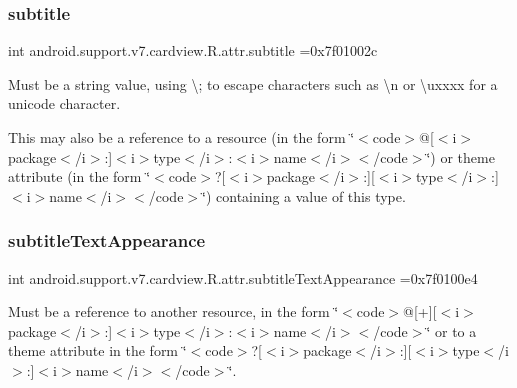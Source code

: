 \subsubsection{\texorpdfstring{subtitle}{subtitle}}
{\footnotesize\ttfamily int android.\+support.\+v7.\+cardview.\+R.\+attr.\+subtitle =0x7f01002c\hspace{0.3cm}{\ttfamily [static]}}

Must be a string value, using \textquotesingle{}\textbackslash{};\textquotesingle{} to escape characters such as \textquotesingle{}\textbackslash{}n\textquotesingle{} or \textquotesingle{}\textbackslash{}uxxxx\textquotesingle{} for a unicode character. 

This may also be a reference to a resource (in the form \char`\"{}$<$code$>$@\mbox{[}$<$i$>$package$<$/i$>$\+:\mbox{]}$<$i$>$type$<$/i$>$\+:$<$i$>$name$<$/i$>$$<$/code$>$\char`\"{}) or theme attribute (in the form \char`\"{}$<$code$>$?\mbox{[}$<$i$>$package$<$/i$>$\+:\mbox{]}\mbox{[}$<$i$>$type$<$/i$>$\+:\mbox{]}$<$i$>$name$<$/i$>$$<$/code$>$\char`\"{}) containing a value of this type. \mbox{\label{classandroid_1_1support_1_1v7_1_1cardview_1_1R_1_1attr_ac11cc67ed57bc796e7e120d6c5b5e347}} 
\subsubsection{\texorpdfstring{subtitle\+Text\+Appearance}{subtitleTextAppearance}}
{\footnotesize\ttfamily int android.\+support.\+v7.\+cardview.\+R.\+attr.\+subtitle\+Text\+Appearance =0x7f0100e4\hspace{0.3cm}{\ttfamily [static]}}

Must be a reference to another resource, in the form \char`\"{}$<$code$>$@\mbox{[}+\mbox{]}\mbox{[}$<$i$>$package$<$/i$>$\+:\mbox{]}$<$i$>$type$<$/i$>$\+:$<$i$>$name$<$/i$>$$<$/code$>$\char`\"{} or to a theme attribute in the form \char`\"{}$<$code$>$?\mbox{[}$<$i$>$package$<$/i$>$\+:\mbox{]}\mbox{[}$<$i$>$type$<$/i$>$\+:\mbox{]}$<$i$>$name$<$/i$>$$<$/code$>$\char`\"{}. \mbox{\label{classandroid_1_1support_1_1v7_1_1cardview_1_1R_1_1attr_a109d4dfb508eff6f5090aca6109b6ddb}} 
